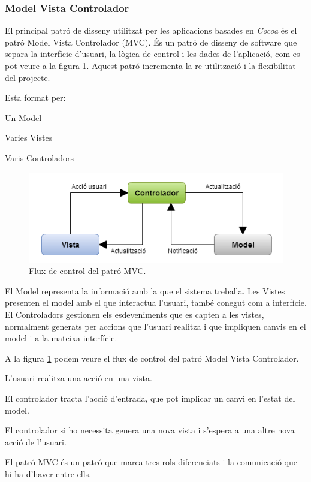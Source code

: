 
\subsubsection{Model Vista Controlador}

El principal patró de disseny utilitzat per les aplicacions basades en \textit{Cocoa} és el patró Model Vista Controlador (MVC). És un patró de disseny de software que separa la interfície d'usuari, la lògica de control i les dades de l'aplicació, com es pot veure a la figura \ref{fig:patro_mvc}. Aquest patró incrementa la re-utilització i la flexibilitat del projecte.

Esta format per:
\begin{compactitem}
    \item Un Model
    \item Varies Vistes
    \item Varis Controladors
\end{compactitem}

\begin{figure}[ht]
    \centering
    \includegraphics[scale=1]{Memoria/Arquitectura/iOS/patro_mvc.png}
    \caption{Flux de control del patró MVC.}
    \label{fig:patro_mvc}
\end{figure}


El Model representa la informació amb la que el sistema treballa. Les Vistes presenten el model amb el que interactua l'usuari, també conegut com a interfície. El Controladors gestionen els esdeveniments que es capten a les vistes, normalment generats per accions que l'usuari realitza i que impliquen canvis en el model i a la mateixa interfície.


A la figura \ref{fig:patro_mvc} podem veure el flux de control del patró Model Vista Controlador.
\begin{compactitem}
    \item L'usuari realitza una acció en una vista.
    \item El controlador tracta l'acció d'entrada, que pot implicar un canvi en l'estat del model.
    \item El controlador si ho necessita genera una nova vista i s'espera a una altre nova acció de l'usuari.
\end{compactitem}

El patró MVC és un patró que marca tres rols diferenciats i la comunicació que hi ha d'haver entre ells.